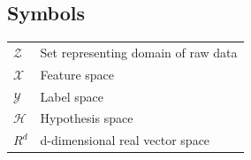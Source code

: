 \documentclass[english, 12pt, a4paper, elec, utf8, online]{aaltothesis}
\begin{document}

\newpage
\begin{abstractpage}[finnish]
\end{abstractpage}

\newpage







\thesistableofcontents



\subsection*{Symbols}

\begin{tabular}{ll}
$\mathcal{Z}$  & Set representing domain of raw data  \\
$\mathcal{X}$  & Feature space \\
$\mathcal{Y}$  & Label space \\
$\mathcal{H}$  & Hypothesis space\\
$R^{d}$        & d-dimensional real vector space
\end{tabular}
\end{document}

